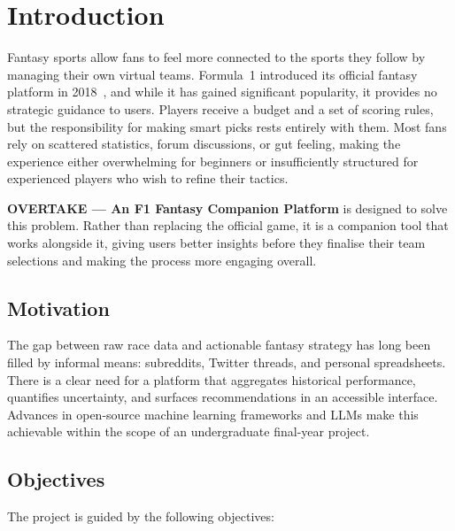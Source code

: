 \documentclass[12pt, a4paper, oneside]{report}
\begin{document}
\newpage

\listoffigures
\listoftables
\newpage

\chapter{Introduction}

Fantasy sports allow fans to feel more connected to the sports they follow by
managing their own virtual teams. Formula~1 introduced its official fantasy
platform in 2018~\cite{f1Fantasy}, and while it has gained significant
popularity, it provides no strategic guidance to users. Players receive a budget
and a set of scoring rules, but the responsibility for making smart picks rests
entirely with them. Most fans rely on scattered statistics, forum discussions,
or gut feeling, making the experience either overwhelming for beginners or
insufficiently structured for experienced players who wish to refine their
tactics.

\textbf{OVERTAKE --- An F1 Fantasy Companion Platform} is designed to solve
this problem. Rather than replacing the official game, it is a companion tool
that works alongside it, giving users better insights before they finalise their
team selections and making the process more engaging overall.

\section{Motivation}

The gap between raw race data and actionable fantasy strategy has long been
filled by informal means: subreddits, Twitter threads, and personal spreadsheets.
There is a clear need for a platform that aggregates historical performance,
quantifies uncertainty, and surfaces recommendations in an accessible interface.
Advances in open-source machine learning frameworks and LLMs make this achievable
within the scope of an undergraduate final-year project.

\section{Objectives}

The project is guided by the following objectives:
\end{document}
